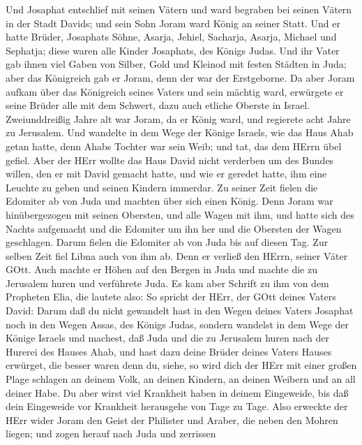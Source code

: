  Und Josaphat entschlief mit seinen Vätern und ward begraben
bei seinen Vätern in der Stadt Davids; und sein Sohn Joram ward König an
seiner Statt.  Und er hatte Brüder, Josaphats Söhne, Asarja,
Jehiel, Sacharja, Asarja, Michael und Sephatja; diese waren alle Kinder
Josaphats, des Königs Judas.  Und ihr Vater gab ihnen viel
Gaben von Silber, Gold und Kleinod mit festen Städten in Juda; aber das
Königreich gab er Joram, denn der war der Erstgeborne.  Da
aber Joram aufkam über das Königreich seines Vaters und sein mächtig
ward, erwürgete er seine Brüder alle mit dem Schwert, dazu auch etliche
Oberste in Israel.  Zweiunddreißig Jahre alt war Joram, da
er König ward, und regierete acht Jahre zu Jerusalem.  Und
wandelte in dem Wege der Könige Israels, wie das Haus Ahab getan hatte,
denn Ahabs Tochter war sein Weib; und tat, das dem HErrn übel gefiel.
 Aber der HErr wollte das Haus David nicht verderben um des
Bundes willen, den er mit David gemacht hatte, und wie er geredet hatte,
ihm eine Leuchte zu geben und seinen Kindern immerdar.  Zu
seiner Zeit fielen die Edomiter ab von Juda und machten über sich einen
König.  Denn Joram war hinübergezogen mit seinen Obersten,
und alle Wagen mit ihm, und hatte sich des Nachts aufgemacht und die
Edomiter um ihn her und die Obersten der Wagen geschlagen. 
Darum fielen die Edomiter ab von Juda bis auf diesen Tag. Zur selben
Zeit fiel Libna auch von ihm ab. Denn er verließ den HErrn, seiner Väter
GOtt.  Auch machte er Höhen auf den Bergen in Juda und
machte die zu Jerusalem huren und verführete Juda.  Es kam
aber Schrift zu ihm von dem Propheten Elia, die lautete also: So spricht
der HErr, der GOtt deines Vaters David: Darum daß du nicht gewandelt
hast in den Wegen deines Vaters Josaphat noch in den Wegen Assas, des
Königs Judas,  sondern wandelst in dem Wege der Könige
Israels und machest, daß Juda und die zu Jerusalem huren nach der
Hurerei des Hauses Ahab, und hast dazu deine Brüder deines Vaters Hauses
erwürget, die besser waren denn du,  siehe, so wird dich
der HErr mit einer großen Plage schlagen an deinem Volk, an deinen
Kindern, an deinen Weibern und an all deiner Habe.  Du aber
wirst viel Krankheit haben in deinem Eingeweide, bis daß dein Eingeweide
vor Krankheit herausgehe von Tage zu Tage.  Also erweckte
der HErr wider Joram den Geist der Philister und Araber, die neben den
Mohren liegen;  und zogen herauf nach Juda und zerrissen
